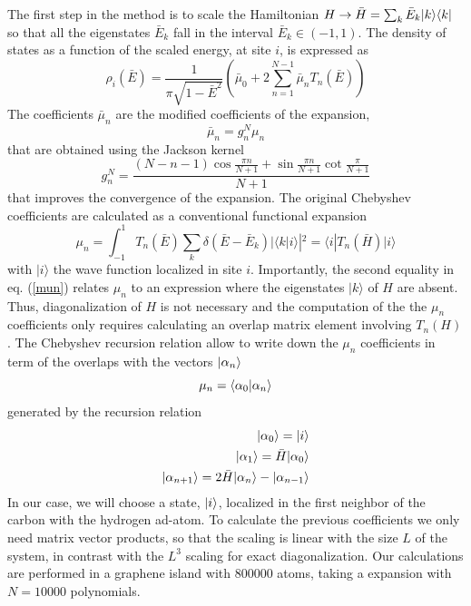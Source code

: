 The first step in the method is to  scale the Hamiltonian $H \rightarrow \bar H=\sum_k\bar E_k |k\rangle\langle k|$
so that all the eigenstates $\bar E_k$ fall in the interval $\bar E_k \in (-1,1)$.  The density of states as a function of the scaled energy, at site $i$,  is expressed as
\begin{equation}
\rho_i(\bar E) = \frac{1}{\pi \sqrt{1-\bar E^2}}
\left (\bar \mu_0 + 2 \sum^{N-1}_{n=1} \bar \mu_n T_n (\bar E)
\right )
\label{KPM}
\end{equation}
The coefficients $\bar \mu_n$ are
the modified coefficients of the expansion,
\begin{equation}
\bar \mu_n = g^N_n \mu_n
\end{equation}
that are obtained using the Jackson kernel\cite{jackson1912approximation}
\begin{equation}
g_n^N =
\frac{(N-n-1)\cos \frac{\pi n}{N+1} + \sin \frac{\pi n}{N+1}
\cot \frac{\pi }{N+1}}{N+1}
\end{equation}
that improves the convergence of the expansion. The original
Chebyshev coefficients are calculated as a conventional
functional expansion
\begin{equation}
\mu_n = \int_{-1}^{1} T_n(\bar E) \sum_k \delta (\bar E-\bar E_k) |\langle k | i \rangle |^2
= \langle i | T_n(\bar H) | i \rangle
\label{mun}
\end{equation}
with $| i \rangle$ the wave function localized in site $i$. Importantly, the
second equality in eq. (\ref{mun}) relates $\mu_n$ to an expression where the
eigenstates $|k\rangle$ of $H$ are absent. Thus, diagonalization of $H$ is not
necessary and  the computation of the the $\mu_n$ coefficients only requires
calculating an overlap matrix element involving $T_n(H)$.
The Chebyshev recursion relation allow to write down the $\mu_n$ coefficients in term of the overlaps with the vectors $|\alpha_n\rangle$
\begin{equation}
\mu_n =
\braket{\alpha_0}{\alpha_n}%
\end{equation}
generated by the recursion relation
\begin{equation}
\begin{aligned}
\ket{\alpha_0} = \ket{i}  \\  %
\ket{\alpha_1} = \bar{H} \ket{\alpha_0} \\
\ket{\alpha_{n+1}} = 2\bar{H} \ket{\alpha_n}- \ket{\alpha_{n-1}}
\end{aligned}
\end{equation}
In our case, we will choose a state, $|i\rangle$, localized in the first neighbor
of the carbon with the hydrogen ad-atom.
To calculate the previous coefficients we only need matrix vector products,
so that the scaling is linear with the size $L$ of the system, in contrast with
the $L^3$ scaling for exact diagonalization.
Our calculations are performed in a graphene island with 800000 atoms,
taking a expansion with $N=10000$ polynomials.




